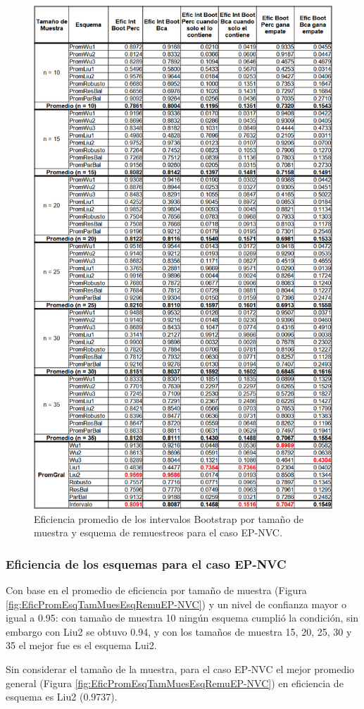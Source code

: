 \begin{figure}[H] 
	\centering 
	\includegraphics[width=0.55\linewidth]{img/EP_NVC_Efic_Boots.png} 
	\caption{Eficiencia promedio de los intervalos Bootstrap por tamaño de muestra y esquema de remuestreos para el caso EP-NVC.} 
	\label{fig:EficPromIntBootsTamMuestEsqRemuEP-NVC}
\end{figure}

\FloatBarrier

\subsubsection{Eficiencia de los esquemas para el caso EP-NVC}
Con base en el promedio de eficiencia por tamaño de muestra (Figura \ref{fig:EficPromEsqTamMuesEsqRemuEP-NVC}) y un nivel de confianza mayor o igual a 0.95: con tamaño de muestra 10 ningún esquema cumplió la condición, sin embargo con Liu2 se obtuvo 0.94, y con los tamaños de muestra 15, 20, 25, 30 y 35 el mejor fue es el esquema Lui2.
\vspace{.5cm}

Sin considerar el tamaño de la muestra, para el caso EP-NVC el mejor promedio general (Figura \ref{fig:EficPromEsqTamMuesEsqRemuEP-NVC}) en eficiencia de esquema es Liu2 (0.9737).


